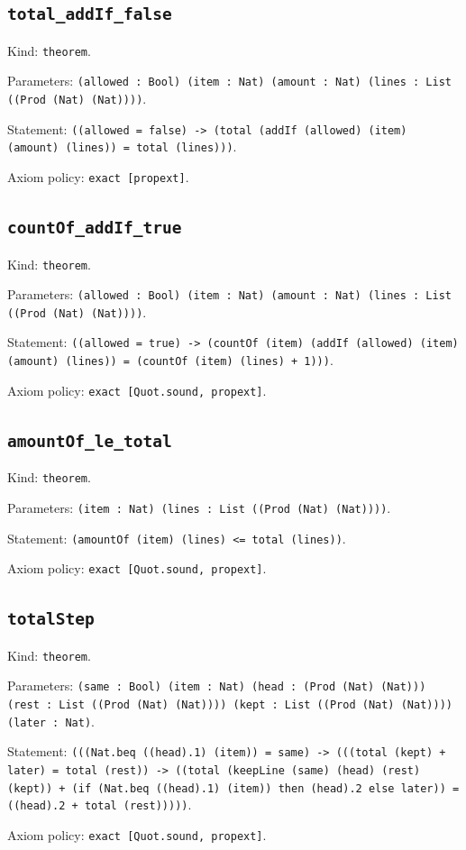 \documentclass[11pt]{article}
\begin{document}
\subsection*{\texttt{total\_addIf\_false}}
\noindent Kind: \texttt{theorem}.\par
\noindent Parameters: \texttt{(allowed : Bool) (item : Nat) (amount : Nat) (lines : List ((Prod (Nat) (Nat))))}.\par
\noindent Statement: \texttt{((allowed = false) -> (total (addIf (allowed) (item) (amount) (lines)) = total (lines)))}.\par
\noindent Axiom policy: \texttt{exact [propext]}.\par
\subsection*{\texttt{countOf\_addIf\_true}}
\noindent Kind: \texttt{theorem}.\par
\noindent Parameters: \texttt{(allowed : Bool) (item : Nat) (amount : Nat) (lines : List ((Prod (Nat) (Nat))))}.\par
\noindent Statement: \texttt{((allowed = true) -> (countOf (item) (addIf (allowed) (item) (amount) (lines)) = (countOf (item) (lines) + 1)))}.\par
\noindent Axiom policy: \texttt{exact [Quot.sound, propext]}.\par
\subsection*{\texttt{amountOf\_le\_total}}
\noindent Kind: \texttt{theorem}.\par
\noindent Parameters: \texttt{(item : Nat) (lines : List ((Prod (Nat) (Nat))))}.\par
\noindent Statement: \texttt{(amountOf (item) (lines) <= total (lines))}.\par
\noindent Axiom policy: \texttt{exact [Quot.sound, propext]}.\par
\subsection*{\texttt{totalStep}}
\noindent Kind: \texttt{theorem}.\par
\noindent Parameters: \texttt{(same : Bool) (item : Nat) (head : (Prod (Nat) (Nat))) (rest : List ((Prod (Nat) (Nat)))) (kept : List ((Prod (Nat) (Nat)))) (later : Nat)}.\par
\noindent Statement: \texttt{(((Nat.beq ((head).1) (item)) = same) -> (((total (kept) + later) = total (rest)) -> ((total (keepLine (same) (head) (rest) (kept)) + (if (Nat.beq ((head).1) (item)) then (head).2 else later)) = ((head).2 + total (rest)))))}.\par
\noindent Axiom policy: \texttt{exact [Quot.sound, propext]}.\par
\end{document}
